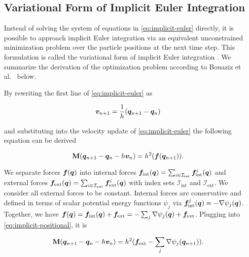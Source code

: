 \subsection{Variational Form of Implicit Euler Integration}\label{ss:variational-implicit-euler}

Instead of solving the system of equations in \autoref{eq:implicit-euler} directly, it is possible to approach implicit
Euler integration via an equivalent unconstrained minimization problem over the particle positions at the next time step. This formulation
is called the variational form of implicit Euler integration \cite{bouaziz2014}. We summarize the derivation of the optimization problem
according to Bouaziz et al.\ \cite{bouaziz2014} below.

By rewriting the first line of \autoref{eq:implicit-euler} as

\[
    \bm{v}_{n+1} = \frac{1}{h}(\bm{q}_{n+1} - \bm{q}_n)
\]

\noindent and substituting into the velocity update of \autoref{eq:implicit-euler} the following equation can be derived

\begin{equation}\label{eq:implicit-positional}
    \mathbf{M}(\bm{q}_{n+1} - \bm{q}_n - h\bm{v}_n) = h^2(\bm{f}(\bm{q}_{n+1})).
\end{equation}

\noindent We separate forces $\bm{f}(\bm{q})$ into internal forces $\bm{f}_{\text{int}}(\bm{q}) = \sum_{i \in \mathcal{I}_{\text{int}}} 
\bm{f}^i_{\text{int}}
(\bm{q})$ and external forces $\bm{f}_{\text{ext}}(\bm{q}) = \sum_{i \in \mathcal{I}_{\text{ext}}} \bm{f}^i_{\text{ext}}(\bm{q})$ 
with index sets $\mathcal{I}_{\text{int}}$ and $\mathcal{I}_{\text{ext}}$. We consider all external forces to be constant. Internal forces 
are conservative and defined in terms of scalar potential energy functions 
$\psi_j$ via $\bm{f}^j_{\text{int}}(\bm{q}) = -\nabla \psi_j(\bm{q})$. Together, we have $\bm{f} (\bm{q}) 
= \bm{f}_{\text{int}} (\bm{q}) + \bm{f}_{\text{ext}} = -\sum_j \nabla \psi_j(\bm{q}) + \bm{f}_{\text{ext}}$. Plugging into 
\autoref{eq:implicit-positional}, it is

\begin{equation}\label{eq:implicit-positional-detailed}
    \mathbf{M}(\bm{q}_{n+1} - \bm{q}_n - h\bm{v}_n) = h^2(\bm{f_\text{ext}} - \sum_j \nabla \psi_j(\bm{q}_{n+1})).
\end{equation}

